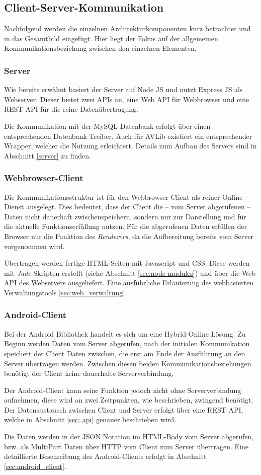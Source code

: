 \subsection{Client-Server-Kommunikation}
Nachfolgend werden die einzelnen Architekturkomponenten kurz betrachtet und in das Gesamtbild eingefügt. Hier liegt der Fokus auf der allgemeinen Kommunikationsbeziehung zwischen den einzelnen Elementen.


\subsubsection{Server}
Wie bereits erwähnt basiert der Server auf Node JS und nutzt Express JS als Webserver.
Dieser bietet zwei \ac{API}s an, eine Web API für Webbrowser und eine REST API für die reine Datenübertragung.

Die Kommunikation mit der MySQL Datenbank erfolgt über einen entsprechenden Datenbank Treiber.
Auch für AVLib existiert ein entsprechender Wrapper, welcher die Nutzung erleichtert.
Details zum Aufbau des Servers sind in Abschnitt \ref{server} zu finden.


\subsubsection{Webbrowser-Client}
Die Kommunikationsstruktur ist für den Webbrowser Client als reiner Online-Dienst ausgelegt.
Dies bedeutet, dass der Client die -- vom Server abgerufenen -- Daten nicht dauerhaft zwischenspeichern, sondern nur zur Darstellung und für die aktuelle Funktionserfüllung nutzen.
Für die abgerufenen Daten erfüllen der Browser nur die Funktion des \emph{Renderers}, da die Aufbereitung bereits vom Server vorgenommen wird.

Übertragen werden fertige HTML-Seiten mit Javascript und \ac{CSS}.
Diese werden mit \emph{Jade}-Skripten erstellt (siehe Abschnitt \ref{sec:node-mudules}) und über die Web API des Webservers ausgeliefert.
Eine ausführliche Erläuterung des webbasierten Verwaltungstools \ref{sec:web_verwaltung}.


\subsubsection{Android-Client}
Bei der Android Bibliothek handelt es sich um eine Hybrid-Online Lösung.
Zu Beginn werden Daten vom Server abgerufen, nach der initialen Kommunikation speichert der Client Daten zwischen, die erst am Ende der Ausführung an den Server übertragen werden.
Zwischen diesen beiden Kommunikationsbeziehungen benötigt der Client keine dauerhafte Serververbindung.

Der Android-Client kann seine Funktion jedoch nicht ohne Serververbindung aufnehmen, diese wird an zwei Zeitpunkten, wie beschrieben, zwingend benötigt.
Der Datenaustausch zwischen Client und Server erfolgt über eine REST API, welche in Abschnitt \ref{sec: api} genauer beschrieben wird.

Die Daten werden in der \ac{JSON} Notation im HTML-Body vom Server abgerufen, bzw. als MultiPart Daten über HTTP vom Client zum Server übertragen.
Eine detaillierte Beschreibung des Android-Clients erfolgt in Abschnitt \ref{sec:android_client}.
